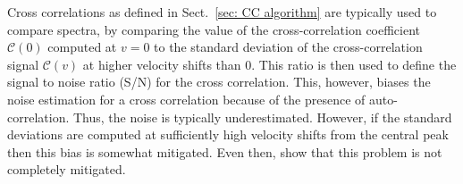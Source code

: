 \documentclass{aa}
\begin{document}

Cross correlations as defined in Sect.~\ref{sec: CC algorithm} are typically used to compare spectra, by comparing the value of the cross-correlation coefficient $\mathcal{C}(0)$ computed at $v=0$ to the standard deviation of the cross-correlation signal $\mathcal{C}(v)$ at higher velocity shifts than $0$.
This ratio is then used to define the signal to noise ratio (S/N) for the cross correlation.
This, however, biases the noise estimation for a cross correlation because of the presence of auto-correlation.
Thus, the noise is typically underestimated.
However, if the standard deviations are computed at sufficiently high velocity shifts from the central peak \citep[e.g., for $|v|\ge 250$ km/s in][]{2018AHoeijmakersMM} then this bias is somewhat mitigated.
Even then, \citet{ruffio2019radial} show that this problem is not completely mitigated. 
\end{document}
